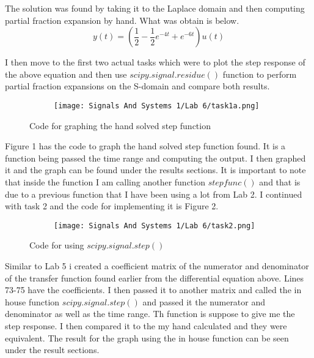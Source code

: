 \documentclass[12pt,a4paper]{article}
\begin{document}
The solution was found by taking it to the Laplace domain and then computing partial fraction expansion by hand. What was obtain is below.
\[y(t) = (\frac{1}{2} -\frac{1}{2} e^{-4t} + e^{-6t})u(t)\]

I then move to the first two actual tasks which were to plot the step response of the above equation and then use $scipy.signal.residue()$ function to perform partial fraction expansions on the S-domain and compare both results.



\begin{figure}[h]
\begin{subfigure}{ 1\textwidth}
\texttt{[image: Signals And Systems 1/Lab 6/task1a.png]}
\end{subfigure}
\caption{Code for graphing the hand solved step function}
\label{fig:image2}
\end{figure}
\clearpage





Figure 1 has the code to graph the hand solved step function found. It is a function being passed the time range and computing the output. I then graphed it and the graph can be found under the results sections. It is important to note that inside the function I am calling another function $stepfunc()$ and that is due to a previous function that I have been using a lot from Lab 2. I continued with task 2 and the code for implementing it is Figure 2.
\begin{figure}[h]
\begin{subfigure}{ 1\textwidth}
\texttt{[image: Signals And Systems 1/Lab 6/task2.png]}
\end{subfigure}
\caption{Code for using $scipy.signal.step()$}
\label{fig:image2}
\end{figure}

Similar to Lab 5  i created a coefficient matrix of the numerator and denominator of the transfer function found earlier from the differential equation above. Lines 73-75 have the coefficients. I then passed it to another matrix and called the in house function $scipy.signal.step()$ and passed it the numerator and denominator as well as the time range. Th function is suppose to give me the step response. I then compared it to the my hand calculated and they were equivalent. The result for the graph using the in house function can be seen under the result sections.

\clearpage
\end{document}
